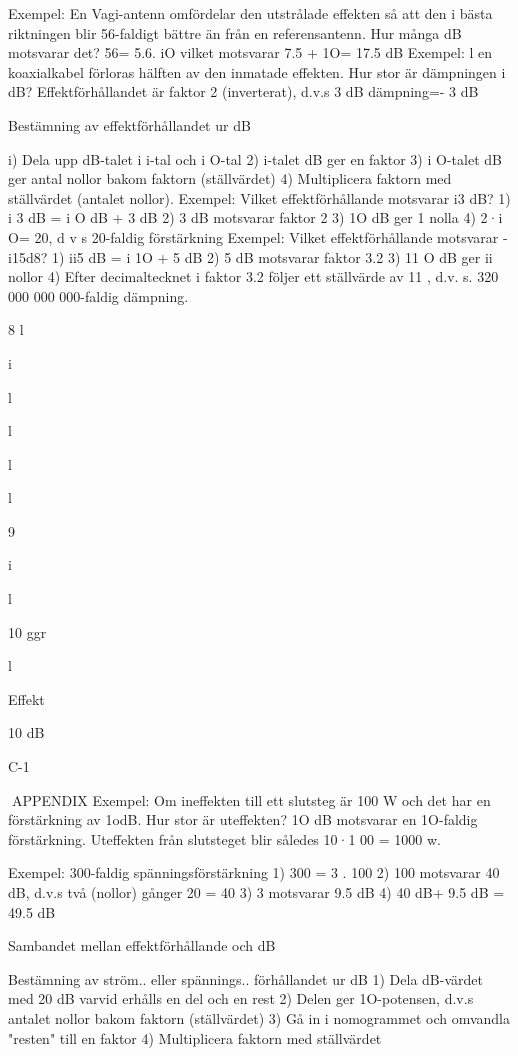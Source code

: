 Exempel: En Vagi-antenn omfördelar den
utstrålade effekten så att den i bästa riktningen blir 56-faldigt bättre än från en
referensantenn. Hur många dB motsvarar
det?
56= 5.6. iO
vilket motsvarar 7.5 + 1O= 17.5 dB
Exempel: l en koaxialkabel förloras hälften
av den inmatade effekten. Hur stor är
dämpningen i dB?
Effektförhållandet är faktor 2 (inverterat),
d.v.s 3 dB dämpning=- 3 dB

Bestämning av effektförhållandet ur dB

i) Dela upp dB-talet i i-tal och i O-tal
2) i-talet dB ger en faktor
3) i O-talet dB ger antal nollor bakom faktorn
(ställvärdet)
4) Multiplicera faktorn med ställvärdet
(antalet nollor).
Exempel: Vilket effektförhållande motsvarar
i3 dB?
1) i 3 dB = i O dB + 3 dB
2) 3 dB motsvarar faktor 2
3) 1O dB ger 1 nolla
4) 2·i O= 20, d v s 20-faldig förstärkning
Exempel: Vilket effektförhållande motsvarar
-i15d8?
1) ii5 dB = i 1O + 5 dB
2) 5 dB motsvarar faktor 3.2
3) 11 O dB ger ii nollor
4) Efter decimaltecknet i faktor 3.2 följer ett
ställvärde av 11 ,
d.v. s. 320 000 000 000-faldig dämpning.

8
l

i

l

l

l

l

9

i

l

10 ggr

l

Effekt

10 dB

C-1

APPENDIX
Exempel: Om ineffekten till ett slutsteg är
100 W och det har en förstärkning av 1odB.
Hur stor är uteffekten?
1O dB motsvarar en 1O-faldig förstärkning.
Uteffekten från slutsteget blir således 10·1 00
= 1000 w.

Exempel: 300-faldig spänningsförstärkning
1) 300 = 3 . 100
2) 100 motsvarar 40 dB, d.v.s två (nollor)
gånger 20 = 40
3) 3 motsvarar 9.5 dB
4) 40 dB+ 9.5 dB = 49.5 dB

Sambandet mellan effektförhållande och dB

Bestämning av ström.. eller spännings..
förhållandet ur dB
1) Dela dB-värdet med 20 dB varvid erhålls
en del och en rest
2) Delen ger 1O-potensen, d.v.s antalet nollor bakom faktorn (ställvärdet)
3) Gå in i nomogrammet och omvandla "resten" till en faktor
4) Multiplicera faktorn med ställvärdet

